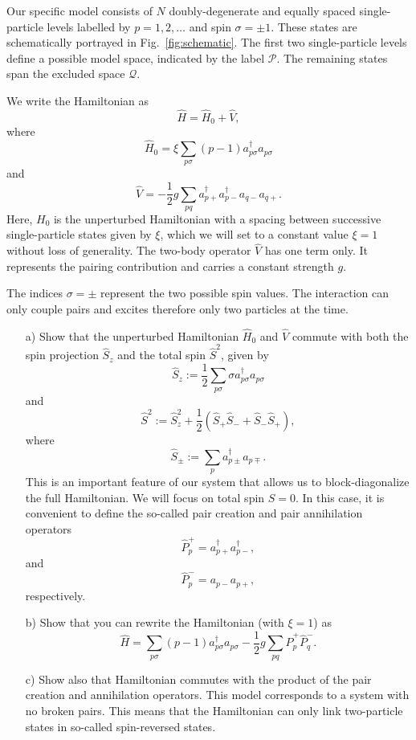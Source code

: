\begin{prob}
Our specific model consists of $N$ doubly-degenerate and equally
spaced single-particle levels labelled by $p=1,2,\dots$ and spin
$\sigma=\pm 1$.  These states are schematically portrayed in
Fig.~\ref{fig:schematic}.  The first two single-particle levels define
a possible model space, indicated by the label $\mathcal{P}$.  The
remaining states span the excluded space $\mathcal{Q}$.

We write the Hamiltonian as
\[ \hat{H} = \hat{H}_0 + \hat{V} , \]
where
\[
\hat{H}_0=\xi\sum_{p\sigma}(p-1)a_{p\sigma}^{\dagger}a_{p\sigma}
\]
and
\[
\hat{V}=-\frac{1}{2}g\sum_{pq}a^{\dagger}_{p+}
a^{\dagger}_{p-}a_{q-}a_{q+}.
\]
Here, $H_0$ is the unperturbed Hamiltonian with a spacing between
successive single-particle states given by $\xi$, which we will set to
a constant value $\xi=1$ without loss of generality. The two-body
operator $\hat{V}$ has one term only. It represents the pairing
contribution and carries a constant strength $g$.

The indices
$\sigma=\pm$ represent the two possible spin values. The interaction
can only couple pairs and excites therefore only two particles at the
time.


\begin{enumerate}
\item[a)]
Show that the unperturbed Hamiltonian $\hat{H}_0$ and $\hat{V}$
  commute with both the spin projection $\hat{S}_z$ and the total spin
  $\hat{S}^2$, given by
\[
  \hat{S}_z := \frac{1}{2}\sum_{p\sigma} \sigma
  a^{\dagger}_{p\sigma}a_{p\sigma}
\]
and
\[
  \hat{S}^2 := \hat{S}_z^2 + \frac{1}{2}(\hat{S}_+\hat{S}_- +
  \hat{S}_-\hat{S}_+),
\]
where
\[
  \hat{S}_\pm := \sum_{p} a^{\dagger}_{p\pm} a_{p\mp}.
\]
This is an important feature of our system that allows us to
block-diagonalize the full Hamiltonian. We will focus on total spin
$S=0$.  In this case, it is convenient to define the so-called pair
creation and pair annihilation operators
\[
\hat{P}^{+}_p = a^{\dagger}_{p+}a^{\dagger}_{p-},
\]
and
\[
\hat{P}^{-}_p = a_{p-}a_{p+},
\]
respectively.
\item[b)]
Show that you can rewrite the Hamiltonian (with $\xi=1$) as
\[
\hat{H}=\sum_{p\sigma}(p-1)a_{p\sigma}^{\dagger}a_{p\sigma}
-\frac{1}{2}g\sum_{pq}\hat{P}^{+}_p\hat{P}^{-}_q.
\]
\item[c)]
Show also that Hamiltonian commutes with the product of the pair
creation and annihilation operators.  This model corresponds to a
system with no broken pairs. This means that the Hamiltonian can only
link two-particle states in so-called spin-reversed states.


\end{enumerate}
\end{prob}
